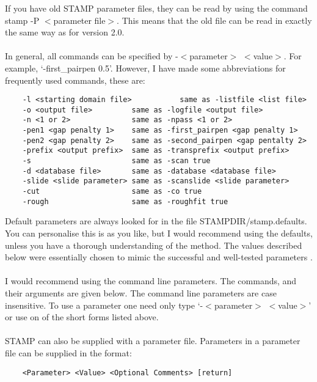     If you have old STAMP parameter files, they can be read by using
    the command stamp -P $<$parameter file$>$.  This means that the old
    file can be read in exactly the same way as for version 2.0.\\
    \\
    In general, all commands can be specified by -$<$parameter$>$ $<$value$>$.
    For example, `-first\_pairpen 0.5'.  However, I have made some
    abbreviations for frequently used commands, these are:

    \begin{scriptsize}\begin{verbatim}
    -l <starting domain file>           same as -listfile <list file>
    -o <output file>         same as -logfile <output file>
    -n <1 or 2>              same as -npass <1 or 2>
    -pen1 <gap penalty 1>    same as -first_pairpen <gap penalty 1>
    -pen2 <gap penalty 2>    same as -second_pairpen <gap pentalty 2>
    -prefix <output prefix>  same as -transprefix <output prefix>
    -s                       same as -scan true
    -d <database file>       same as -database <database file>
    -slide <slide parameter> same as -scanslide <slide parameter>
    -cut                     same as -co true 
    -rough                   same as -roughfit true
    \end{verbatim} \end{scriptsize}

    Default parameters are always looked for in the file
    STAMPDIR/stamp.defaults.  You can personalise this is as you like, but I 
    would recommend using the defaults, unless you have a thorough 
    understanding of the method. The values described below were essentially 
    chosen to mimic the  successful and well-tested parameters 
    \cite{rb92b}.\\
    \\
    I would recommend using the command line parameters.  The commands, and 
    their arguments are given below.  The command line parameters are case 
    insensitive.  To use a parameter one need only type `-$<$parameter$>$ $<$value$>$'
    or use on of the short forms listed above.\\
    \\
    STAMP can also be supplied with a parameter file.  Parameters in
    a parameter file can be supplied in the format:\\

    \begin{scriptsize}\begin{verbatim}
    <Parameter> <Value> <Optional Comments> [return]
    \end{verbatim} \end{scriptsize}


